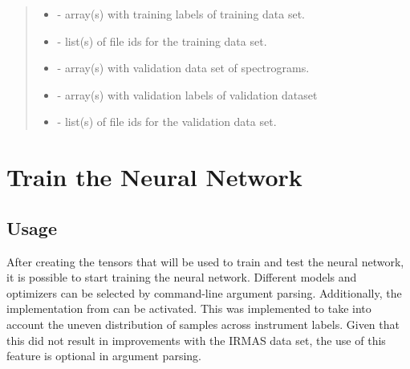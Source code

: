 \documentclass[letterpaper,10pt,english]{sphinxmanual}
\begin{document}
\begin{fulllineitems}
\begin{fulllineitems}
\begin{quote}
\begin{description}
\begin{itemize}
\item {} 
  - array(s) with training labels of training data set.

\item {} 
  - list(s) of file ids for the training data set.

\item {} 
  - array(s) with validation data set of spectrograms.

\item {} 
  - array(s) with validation labels of validation dataset

\item {} 
  - list(s) of file ids for the validation data set.

\end{itemize}


\end{description}\end{quote}

\end{fulllineitems}


\end{fulllineitems}



\section{Train the Neural Network}
\label{\detokenize{train::doc}}\label{\detokenize{train:train-the-neural-network}}

\subsection{Usage}
\label{\detokenize{train:usage}}
After creating the tensors that will be used to train and test the neural network, it is
possible to start training the neural network. Different models and optimizers can be selected
by command-line argument parsing. Additionally, the  implementation from 
can be activated. This was implemented to take into account the uneven distribution of samples
across instrument labels. Given that this did not result in improvements with the IRMAS data
set, the use of this feature is optional in argument parsing. 
\end{document}

